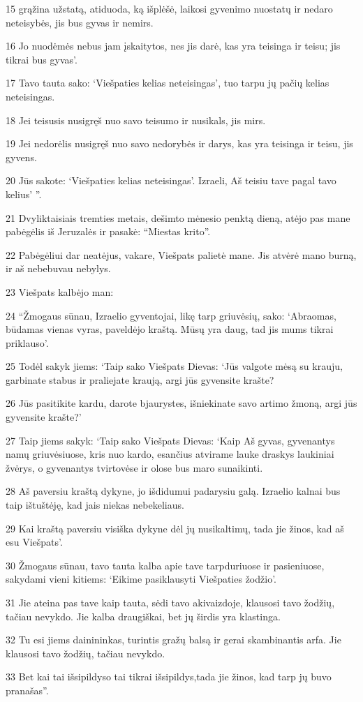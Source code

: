 \par 15 grąžina užstatą, atiduoda, ką išplėšė, laikosi gyvenimo nuostatų ir nedaro neteisybės, jis bus gyvas ir nemirs. 
\par 16 Jo nuodėmės nebus jam įskaitytos, nes jis darė, kas yra teisinga ir teisu; jis tikrai bus gyvas’. 
\par 17 Tavo tauta sako: ‘Viešpaties kelias neteisingas’, tuo tarpu jų pačių kelias neteisingas. 
\par 18 Jei teisusis nusigręš nuo savo teisumo ir nusikals, jis mirs. 
\par 19 Jei nedorėlis nusigręš nuo savo nedorybės ir darys, kas yra teisinga ir teisu, jis gyvens. 
\par 20 Jūs sakote: ‘Viešpaties kelias neteisingas’. Izraeli, Aš teisiu tave pagal tavo kelius’ ”. 
\par 21 Dvyliktaisiais tremties metais, dešimto mėnesio penktą dieną, atėjo pas mane pabėgėlis iš Jeruzalės ir pasakė: “Miestas krito”. 
\par 22 Pabėgėliui dar neatėjus, vakare, Viešpats palietė mane. Jis atvėrė mano burną, ir aš nebebuvau nebylys. 
\par 23 Viešpats kalbėjo man: 
\par 24 “Žmogaus sūnau, Izraelio gyventojai, likę tarp griuvėsių, sako: ‘Abraomas, būdamas vienas vyras, paveldėjo kraštą. Mūsų yra daug, tad jis mums tikrai priklauso’. 
\par 25 Todėl sakyk jiems: ‘Taip sako Viešpats Dievas: ‘Jūs valgote mėsą su krauju, garbinate stabus ir praliejate kraują, argi jūs gyvensite krašte? 
\par 26 Jūs pasitikite kardu, darote bjaurystes, išniekinate savo artimo žmoną, argi jūs gyvensite krašte?’ 
\par 27 Taip jiems sakyk: ‘Taip sako Viešpats Dievas: ‘Kaip Aš gyvas, gyvenantys namų griuvėsiuose, kris nuo kardo, esančius atvirame lauke draskys laukiniai žvėrys, o gyvenantys tvirtovėse ir olose bus maro sunaikinti. 
\par 28 Aš paversiu kraštą dykyne, jo išdidumui padarysiu galą. Izraelio kalnai bus taip ištuštėję, kad jais niekas nebekeliaus. 
\par 29 Kai kraštą paversiu visiška dykyne dėl jų nusikaltimų, tada jie žinos, kad aš esu Viešpats’. 
\par 30 Žmogaus sūnau, tavo tauta kalba apie tave tarpduriuose ir pasieniuose, sakydami vieni kitiems: ‘Eikime pasiklausyti Viešpaties žodžio’. 
\par 31 Jie ateina pas tave kaip tauta, sėdi tavo akivaizdoje, klausosi tavo žodžių, tačiau nevykdo. Jie kalba draugiškai, bet jų širdis yra klastinga. 
\par 32 Tu esi jiems dainininkas, turintis gražų balsą ir gerai skambinantis arfa. Jie klausosi tavo žodžių, tačiau nevykdo. 
\par 33 Bet kai tai išsipildys­o tai tikrai išsipildys,­tada jie žinos, kad tarp jų buvo pranašas”.



